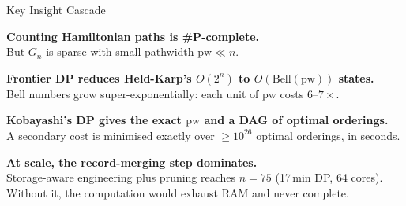 \documentclass[aspectratio=169,t]{beamer}
\newcommand{\pw}{\mathrm{pw}}
\newcommand{\Bell}{\mathrm{Bell}}
\begin{document}
\begin{frame}{Key Insight Cascade}
\vspace{0.1cm}
\begin{center}
{\small
\colorbox{lightblue!40}{\parbox{0.88\textwidth}{\centering\vspace{3pt}
  \textbf{Counting Hamiltonian paths is \#P-complete.}\\[1pt]
  But $G_n$ is sparse with small pathwidth $\pw \ll n$.
\vspace{3pt}}}

\vspace{1pt}{\color{midblue}$\downarrow$}\vspace{1pt}

\colorbox{midblue!20}{\parbox{0.88\textwidth}{\centering\vspace{3pt}
  \textbf{Frontier DP reduces Held-Karp's $O(2^n)$ to $O(\Bell(\pw))$ states.}\\[1pt]
  Bell numbers grow super-exponentially: each unit of $\pw$ costs $6$--$7\times$.
\vspace{3pt}}}

\vspace{1pt}{\color{midblue}$\downarrow$}\vspace{1pt}

\colorbox{accent!15}{\parbox{0.88\textwidth}{\centering\vspace{3pt}
  \textbf{Kobayashi's DP gives the exact $\pw$ and a DAG of optimal orderings.}\\[1pt]
  A secondary cost is minimised exactly over $\ge10^{26}$ optimal orderings, in seconds.
\vspace{3pt}}}

\vspace{1pt}{\color{midblue}$\downarrow$}\vspace{1pt}

\colorbox{dkgreen!15}{\parbox{0.88\textwidth}{\centering\vspace{3pt}
  \textbf{At scale, the record-merging step dominates.}\\[1pt]
  Storage-aware engineering plus pruning reaches $n=75$ (17\,min DP, 64 cores).\\[1pt]
  Without it, the computation would exhaust RAM and never complete.
\vspace{3pt}}}
}
\end{center}
\end{frame}
\end{document}
